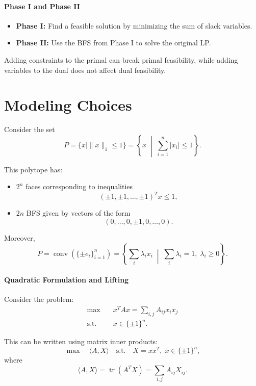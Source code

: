 \documentclass[12pt,oneside]{book}
\numberwithin{equation}{section}
\theoremstyle{definition}
\theoremstyle{plain}
\theoremstyle{remark}
\begin{document}
\paragraph{Phase I and Phase II}
\begin{itemize}
\item \textbf{Phase I:} Find a feasible solution by minimizing the sum of slack variables.
\item \textbf{Phase II:} Use the BFS from Phase I to solve the original LP.
\end{itemize}

\medskip

Adding constraints to the primal can break primal feasibility, while adding variables to the dual does not affect dual feasibility.

\section{Modeling Choices}

Consider the set
\[
P = \{ x \mid \|x\|_1 \le 1 \}
= \left\{ x \;\middle|\; \sum_{i=1}^n |x_i| \le 1 \right\}.
\]

This polytope has:
\begin{itemize}
\item $2^n$ faces corresponding to inequalities
\[
(\pm 1, \pm 1, \dots, \pm 1)^T x \le 1,
\]
\item $2n$ BFS given by vectors of the form
\[
(0, \dots, 0, \pm 1, 0, \dots, 0).
\]
\end{itemize}

Moreover,
\[
P = \operatorname{conv}\left( \{ \pm e_i \}_{i=1}^n \right)
= \left\{ \sum_i \lambda_i x_i \;\middle|\; \sum_i \lambda_i = 1,\; \lambda_i \ge 0 \right\}.
\]

\paragraph{Quadratic Formulation and Lifting}

Consider the problem:
\[
\begin{aligned}
\max \quad & x^T A x = \sum_{i,j} A_{ij} x_i x_j \\
\text{s.t.} \quad & x \in \{\pm 1\}^n.
\end{aligned}
\]

This can be written using matrix inner products:
\[
\max \quad \langle A, X \rangle
\quad \text{s.t.} \quad X = x x^T,\; x \in \{\pm 1\}^n,
\]
where
\[
\langle A, X \rangle = \operatorname{tr}(A^T X) = \sum_{i,j} A_{ij} X_{ij}.
\]
\end{document}
